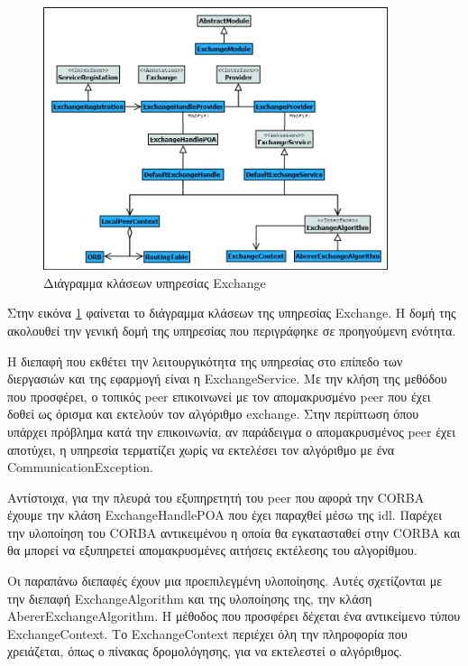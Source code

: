 \begin{figure}[htbp]
  \begin{center}
    \includegraphics[width=0.9\textwidth]{Figures/Architecture/Service_Layer/ExchangeService_ClassDiagram.png}
  \end{center}
  \caption{Διάγραμμα κλάσεων υπηρεσίας Exchange}
  \label{fig:ExhangeService}
\end{figure}

Στην εικόνα \ref{fig:ExhangeService} φαίνεται το διάγραμμα κλάσεων της 
υπηρεσίας Exchange. Η δομή της ακολουθεί την γενική δομή της υπηρεσίας που 
περιγράφηκε σε προηγούμενη ενότητα. 

Η διεπαφή που εκθέτει την λειτουργικότητα της υπηρεσίας στο επίπεδο των 
διεργασιών και της εφαρμογή είναι η ExchangeService. Με την κλήση της 
μεθόδου που προσφέρει, ο τοπικός peer επικοινωνεί με τον απομακρυσμένο 
peer που έχει δοθεί ως όρισμα και εκτελούν τον αλγόριθμο exchange. Στην 
περίπτωση όπου υπάρχει πρόβλημα κατά την επικοινωνία, αν παράδειγμα ο 
απομακρυσμένος peer έχει αποτύχει, η υπηρεσία τερματίζει χωρίς να 
εκτελέσει τον αλγόριθμο με ένα CommunicationException.

Αντίστοιχα, για την πλευρά του εξυπηρετητή του peer που αφορά την CORBA 
έχουμε την κλάση ExchangeHandlePOA που έχει παραχθεί μέσω της idl. 
Παρέχει την υλοποίηση του CORBA αντικειμένου η οποία θα εγκατασταθεί 
στην CORBA και θα μπορεί να εξυπηρετεί απομακρυσμένες αιτήσεις εκτέλεσης 
του αλγορίθμου.

Οι παραπάνω διεπαφές έχουν μια προεπιλεγμένη υλοποίησης. Αυτές 
σχετίζονται με την διεπαφή ExchangeAlgorithm και της υλοποίησης της, την κλάση 
AbererExchangeAlgorithm. Η μέθοδος που προσφέρει δέχεται ένα αντικείμενο 
τύπου ExchangeContext. Το ExchangeContext περιέχει όλη την πληροφορία 
που χρειάζεται, όπως ο πίνακας δρομολόγησης, για να εκτελεστεί ο 
αλγόριθμος.

